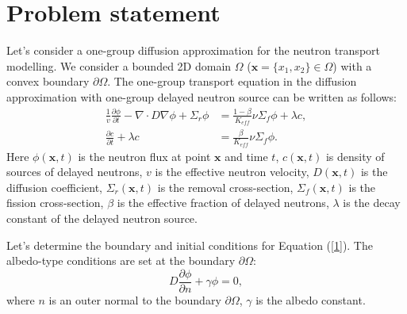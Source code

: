\documentclass[runningheads]{llncs}
\begin{document}
\section{Problem statement}
Let's consider a one-group diffusion approximation for the neutron transport modelling. 
We consider a bounded 2D domain  $\Omega$ ($\bm x = \{x_1, x_2\} \in \Omega$) with a convex boundary $\partial \Omega$. 
The one-group transport equation in the diffusion approximation with one-group delayed neutron source can be written as follows:
\begin{equation}\label{1}
\begin{split}
 \frac{1}{v} \frac{\partial \phi}{\partial t} - \nabla \cdot D \nabla \phi + \Sigma_r \phi &= \frac{1 - \beta}{K_{eff}} \nu \Sigma_f \phi + \lambda c, \\
\frac{\partial c}{\partial t} + \lambda c &= \frac{\beta}{K_{eff}} \nu \Sigma_f \phi.
\end{split}
\end{equation} 
Here $\phi(\bm x,t)$ is the neutron flux  at point $\bm x$ and time $t$,
$c(\bm x,t)$ is density of sources of delayed neutrons,
$v$ is the effective neutron velocity,
$D(\bm x, t)$ is the diffusion coefficient, 
$\Sigma_r(\bm x,t)$ is the removal cross-section,
$\Sigma_f(\bm x,t)$ is the fission cross-section,
$\beta$ is the effective fraction of delayed neutrons, 
$\lambda$ is the decay constant of the delayed neutron source.

Let's determine the boundary and initial conditions for Equation (\ref{1}).
The albedo-type conditions are set at the boundary  $\partial \Omega$:
\begin{equation}\label{2}
 D\frac{\partial \phi}{\partial n} + \gamma \phi = 0,
\end{equation} 
where $n$ is an outer normal to the boundary $\partial \Omega$, $\gamma$ is the albedo constant.
\end{document}

